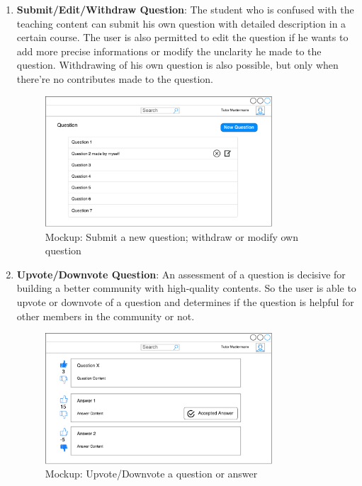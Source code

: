 \begin{enumerate}
\item
\textbf{Submit/Edit/Withdraw Question}: The student who is confused with the teaching content can submit his own question with detailed description in a certain course. The user is also permitted to edit the question if he wants to add more precise informations or modify the unclarity he made to the question. Withdrawing of his own question is also possible, but only when there're no contributes made to the question.

\begin{figure}[!htbp]
  \centering
    \includegraphics[width=0.8\textwidth]{Figures/mockup/New-question.pdf}
  \caption{Mockup: Submit a new question; withdraw or modify own question}
\end{figure}

\item
\textbf{Upvote/Downvote Question}: An assessment of a question is decisive for building a better community with high-quality contents. So the user is able to upvote or downvote of a question and determines if the question is helpful for other members in the community or not.

\begin{figure}[!htbp]
  \centering
    \includegraphics[width=0.8\textwidth]{Figures/mockup/question-vote.pdf}
  \caption{Mockup: Upvote/Downvote a question or answer}
\end{figure}


\end{enumerate}
